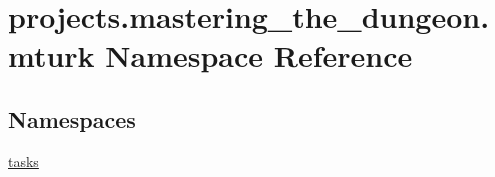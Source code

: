 \hypertarget{namespaceprojects_1_1mastering__the__dungeon_1_1mturk}{}\section{projects.\+mastering\+\_\+the\+\_\+dungeon.\+mturk Namespace Reference}
\label{namespaceprojects_1_1mastering__the__dungeon_1_1mturk}
\subsection*{Namespaces}
\begin{DoxyCompactItemize}
\item 
 \hyperlink{namespaceprojects_1_1mastering__the__dungeon_1_1mturk_1_1tasks}{tasks}
\end{DoxyCompactItemize}
